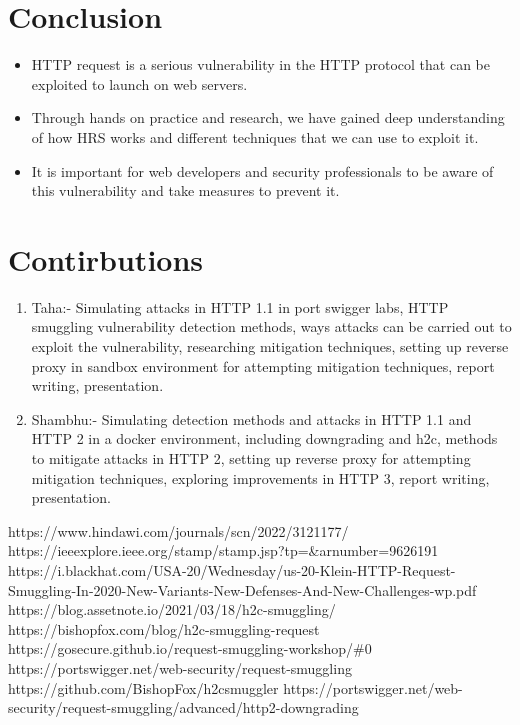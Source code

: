 \documentclass[conference]{IEEEtran}
\begin{document}
\section{Conclusion}
\begin{itemize}
    \item HTTP request is a serious vulnerability in the HTTP protocol that can be exploited to launch on web servers.
    \item Through hands on practice and research, we have gained deep understanding of how HRS works and different techniques that we can use to exploit it.
    \item It is important for web developers and security professionals to be aware of this vulnerability and take measures to prevent it.
\end{itemize}

\section{Contirbutions}
\begin{enumerate}
    \item Taha:- Simulating attacks in HTTP 1.1 in port swigger labs, HTTP smuggling vulnerability detection methods, ways attacks can be carried out to exploit the vulnerability, researching mitigation techniques, setting up reverse proxy in sandbox environment for attempting mitigation techniques, report writing, presentation.
    \item Shambhu:- Simulating detection methods and attacks in HTTP 1.1 and HTTP 2 in a docker environment, including downgrading and h2c, methods to mitigate attacks in HTTP 2, setting up reverse proxy for attempting mitigation techniques, exploring improvements in HTTP 3, report writing, presentation.
\end{enumerate}

\begin{thebibliography}{9}

 https://www.hindawi.com/journals/scn/2022/3121177/
 https://ieeexplore.ieee.org/stamp/stamp.jsp?tp=\&arnumber=9626191
 https://i.blackhat.com/USA-20/Wednesday/us-20-Klein-HTTP-Request-Smuggling-In-2020-New-Variants-New-Defenses-And-New-Challenges-wp.pdf
 https://blog.assetnote.io/2021/03/18/h2c-smuggling/
 https://bishopfox.com/blog/h2c-smuggling-request 
 https://gosecure.github.io/request-smuggling-workshop/\#0
 https://portswigger.net/web-security/request-smuggling
 https://github.com/BishopFox/h2csmuggler
 https://portswigger.net/web-security/request-smuggling/advanced/http2-downgrading

\end{thebibliography}
\end{document}
